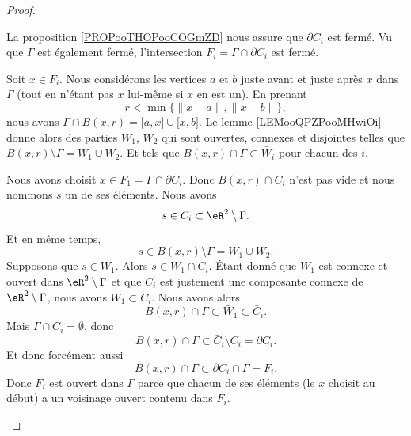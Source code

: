 \begin{proof}
\begin{subproof}
		La proposition \ref{PROPooTHOPooCOGmZD} nous assure que \( \partial C_i\) est fermé. Vu que \( \Gamma\) est également fermé, l'intersection \( F_i=\Gamma\cap \partial C_i\) est fermé.

		Soit \( x\in F_i\). Nous considérons les vertices \( a\) et \( b\) juste avant et juste après \( x\) dans \( \Gamma\) (tout en n'étant pas \( x\) lui-même si \( x\) en est un). En prenant
		\begin{equation}
			r<\min\{ \| x-a \|,\| x-b \| \},
		\end{equation}
		nous avons \( \Gamma\cap B(x,r)=\mathopen[ a,x\mathclose]\cup\mathopen[ x,b\mathclose]\). Le lemme \ref{LEMooQPZPooMHwiOi} donne alors des parties \( W_1\), \( W_2\) qui sont ouvertes, connexes et disjointes telles que \( B(x,r)\setminus\Gamma=W_1\cup W_2\). Et tels que \( B(x,r)\cap \Gamma\subset \bar W_i\) pour chacun des \( i\).

		Nous avons choisit \( x\in F_1=\Gamma\cap\partial C_i\). Donc \( B(x,r)\cap C_i\) n'est pas vide et nous nommons \( s\) un de ses éléments. Nous avons
		\begin{equation}
			s\in C_i\subset \eR^2\setminus \Gamma.
		\end{equation}
		Et en même temps,
		\begin{equation}
			s\in B(x,r)\setminus \Gamma=W_1\cup W_2.
		\end{equation}
		Supposons que \( s\in W_1\). Alors \( s\in W_1\cap C_i\). Étant donné que \( W_1\) est connexe et ouvert dans \( \eR^2\setminus \Gamma\) et que \( C_i\) est justement une composante connexe  de \( \eR^2\setminus \Gamma\), nous avons \( W_1\subset C_i\). Nous avons alors
		\begin{equation}
			B(x,r)\cap \Gamma\subset \bar W_1\subset \bar C_i.
		\end{equation}
		Mais \( \Gamma\cap C_i=\emptyset\), donc
		\begin{equation}
			B(x,r)\cap \Gamma\subset \bar C_i\setminus C_i=\partial C_i.
		\end{equation}
		Et donc forcément aussi
		\begin{equation}
			B(x,r)\cap \Gamma\subset \partial C_i\cap \Gamma=F_i.
		\end{equation}
		Donc \( F_i\) est ouvert dans \( \Gamma\) parce que chacun de ses éléments (le \( x\) choisit au début) a un voisinage ouvert contenu dans \( F_i\).


\end{subproof}
\end{proof}
